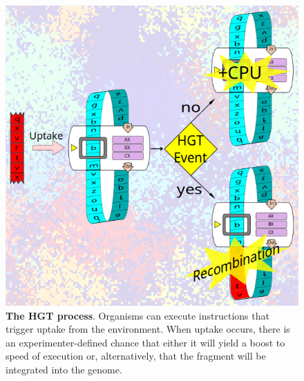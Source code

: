 \documentclass[PhD]{msu-thesis}
\begin{document}
	\begin{figure}[h!]
	\begin{center}
	\includegraphics[width=0.7\columnwidth]{figures/HGT/hgt_figure.png}
	\caption{\textbf{The HGT process}. Organisms can execute instructions that trigger uptake from the environment. When uptake occurs, there is an experimenter-defined chance that either it will yield a boost to speed of execution or, alternatively, that the fragment will be integrated into the genome.
	}\label{fig:hgtprocess}
	\end{center}
	\end{figure}
\end{document}
